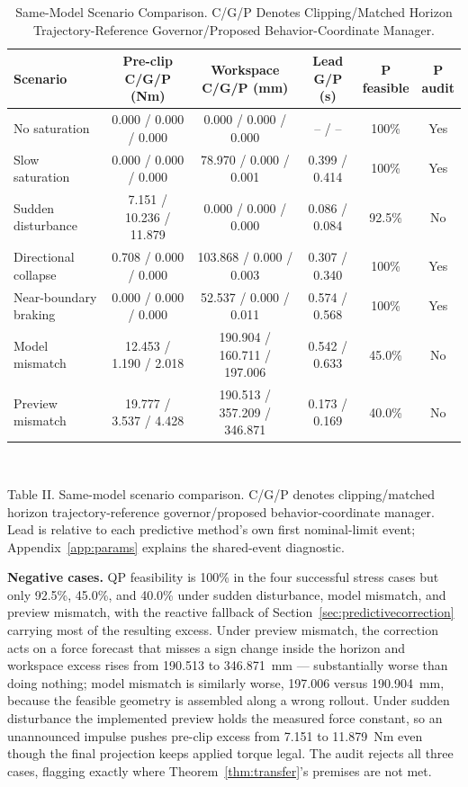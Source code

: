 \documentclass[journal]{IEEEtran}
\begin{document}
\begin{table}[t]
\caption{Same-Model Scenario Comparison. C/G/P Denotes Clipping/Matched Horizon Trajectory-Reference Governor/Proposed Behavior-Coordinate Manager.}
\label{tab:scenarios}
\centering
\footnotesize
\setlength{\tabcolsep}{4pt}
\begin{tabular}{@{}lccccc@{}}
\toprule
Scenario & \shortstack{Pre-clip\\C/G/P (Nm)} & \shortstack{Workspace\\C/G/P (mm)} & \shortstack{Lead\\G/P (s)} & \shortstack{P\\feasible} & \shortstack{P\\audit} \\
\midrule
No saturation & 0.000 / 0.000 / 0.000 & 0.000 / 0.000 / 0.000 & -- / -- & 100\% & Yes \\
Slow saturation & 0.000 / 0.000 / 0.000 & 78.970 / 0.000 / 0.001 & 0.399 / 0.414 & 100\% & Yes \\
Sudden disturbance & 7.151 / 10.236 / 11.879 & 0.000 / 0.000 / 0.000 & 0.086 / 0.084 & 92.5\% & No \\
Directional collapse & 0.708 / 0.000 / 0.000 & 103.868 / 0.000 / 0.003 & 0.307 / 0.340 & 100\% & Yes \\
Near-boundary braking & 0.000 / 0.000 / 0.000 & 52.537 / 0.000 / 0.011 & 0.574 / 0.568 & 100\% & Yes \\
Model mismatch & 12.453 / 1.190 / 2.018 & 190.904 / 160.711 / 197.006 & 0.542 / 0.633 & 45.0\% & No \\
Preview mismatch & 19.777 / 3.537 / 4.428 & 190.513 / 357.209 / 346.871 & 0.173 / 0.169 & 40.0\% & No \\
\bottomrule
\end{tabular}
\\[2pt]
\raggedright\footnotesize Table II. Same-model scenario comparison. C/G/P denotes clipping/matched horizon trajectory-reference governor/proposed behavior-coordinate manager. Lead is relative to each predictive method's own first nominal-limit event; Appendix~\ref{app:params} explains the shared-event diagnostic.
\end{table}

\textbf{Negative cases.} QP feasibility is 100\% in the four successful stress cases but only 92.5\%, 45.0\%, and 40.0\% under sudden disturbance, model mismatch, and preview mismatch, with the reactive fallback of Section~\ref{sec:predictivecorrection} carrying most of the resulting excess. Under preview mismatch, the correction acts on a force forecast that misses a sign change inside the horizon and workspace excess rises from 190.513 to 346.871~mm --- substantially worse than doing nothing; model mismatch is similarly worse, 197.006 versus 190.904~mm, because the feasible geometry is assembled along a wrong rollout. Under sudden disturbance the implemented preview holds the measured force constant, so an unannounced impulse pushes pre-clip excess from 7.151 to 11.879~Nm even though the final projection keeps applied torque legal. The audit rejects all three cases, flagging exactly where Theorem~\ref{thm:transfer}'s premises are not met.
\end{document}
